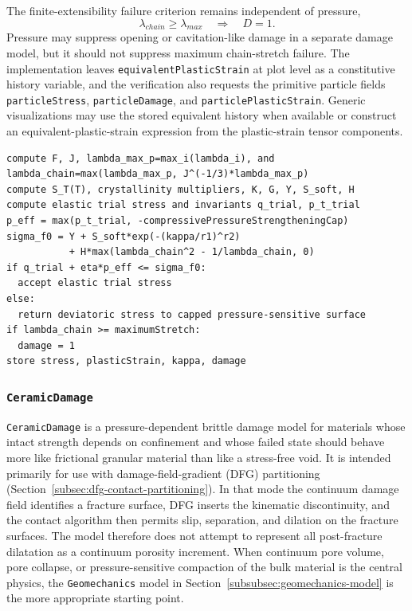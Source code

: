 The finite-extensibility failure criterion remains independent of pressure,
\begin{equation}
  \lambda_{chain}\ge \lambda_{max}\quad\Rightarrow\quad D=1.
  \label{eq:surface-polymer-maximum-stretch-failure}
\end{equation}
Pressure may suppress opening or cavitation-like damage in a separate damage model, but it should not suppress maximum chain-stretch failure.  The implementation leaves \texttt{equivalentPlasticStrain} at plot level as a constitutive history variable, and the verification also requests the primitive particle fields \texttt{particleStress}, \texttt{particleDamage}, and \texttt{particlePlasticStrain}.  Generic visualizations may use the stored equivalent history when available or construct an equivalent-plastic-strain expression from the plastic-strain tensor components.

\begin{lstlisting}[caption={SurfaceInformedPolymer update structure.},label={alg:surface-informed-polymer-update},basicstyle=\ttfamily\small]
compute F, J, lambda_max_p=max_i(lambda_i), and lambda_chain=max(lambda_max_p, J^(-1/3)*lambda_max_p)
compute S_T(T), crystallinity multipliers, K, G, Y, S_soft, H
compute elastic trial stress and invariants q_trial, p_t_trial
p_eff = max(p_t_trial, -compressivePressureStrengtheningCap)
sigma_f0 = Y + S_soft*exp(-(kappa/r1)^r2)
           + H*max(lambda_chain^2 - 1/lambda_chain, 0)
if q_trial + eta*p_eff <= sigma_f0:
  accept elastic trial stress
else:
  return deviatoric stress to capped pressure-sensitive surface
if lambda_chain >= maximumStretch:
  damage = 1
store stress, plasticStrain, kappa, damage
\end{lstlisting}

\subsubsection{\texttt{CeramicDamage}}
\label{subsubsec:ceramic-damage-model}

\texttt{CeramicDamage} is a pressure-dependent brittle damage model for materials whose intact strength depends on confinement and whose failed state should behave more like frictional granular material than like a stress-free void.  It is intended primarily for use with damage-field-gradient (DFG) partitioning (Section~\ref{subsec:dfg-contact-partitioning}).  In that mode the continuum damage field identifies a fracture surface, DFG inserts the kinematic discontinuity, and the contact algorithm then permits slip, separation, and dilation on the fracture surfaces.  The model therefore does not attempt to represent all post-fracture dilatation as a continuum porosity increment.  When continuum pore volume, pore collapse, or pressure-sensitive compaction of the bulk material is the central physics, the \texttt{Geomechanics} model in Section~\ref{subsubsec:geomechanics-model} is the more appropriate starting point.

